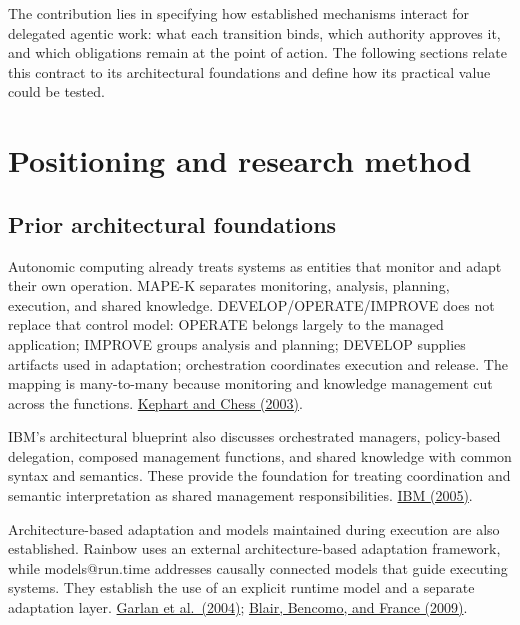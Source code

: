 \documentclass[preprint,12pt,authoryear]{elsarticle}
\begin{document}
The contribution lies in specifying how established mechanisms interact
for delegated agentic work: what each transition binds, which authority
approves it, and which obligations remain at the point of action. The
following sections relate this contract to its architectural foundations
and define how its practical value could be tested.

\section{Positioning and research
method}\label{positioning-and-research-method}

\subsection{Prior architectural
foundations}\label{prior-architectural-foundations}

Autonomic computing already treats systems as entities that monitor and
adapt their own operation. MAPE-K separates monitoring, analysis,
planning, execution, and shared knowledge. DEVELOP/OPERATE/IMPROVE does
not replace that control model: OPERATE belongs largely to the managed
application; IMPROVE groups analysis and planning; DEVELOP supplies
artifacts used in adaptation; orchestration coordinates execution and
release. The mapping is many-to-many because monitoring and knowledge
management cut across the functions.
\href{https://doi.org/10.1109/MC.2003.1160055}{Kephart and Chess
(2003)}.

IBM's architectural blueprint also discusses orchestrated managers,
policy-based delegation, composed management functions, and shared
knowledge with common syntax and semantics. These provide the foundation
for treating coordination and semantic interpretation as shared
management responsibilities.
\href{https://users.cs.fiu.edu/~sadjadi/Teaching/Autonomic\%20Grid\%20Computing/CIS-6612-Summer-2006/AC-Blueprint-WhitePaper-V7.pdf}{IBM
(2005)}.

Architecture-based adaptation and models maintained during execution are
also established. Rainbow uses an external architecture-based adaptation
framework, while models@run.time addresses causally connected models
that guide executing systems. They establish the use of an explicit
runtime model and a separate adaptation layer.
\href{https://www.cs.cmu.edu/~able/publications/computer04/}{Garlan et
al.~(2004)}; \href{https://doi.org/10.1109/MC.2009.326}{Blair, Bencomo,
and France (2009)}.
\end{document}

